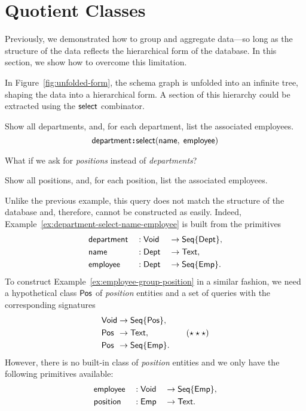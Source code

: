 
\section{Quotient Classes}
\label{sec:quotients}

Previously, we demonstrated how to group and aggregate data---so long as the
structure of the data reflects the hierarchical form of the database.  In this
section, we show how to overcome this limitation.

In Figure~\ref{fig:unfolded-form}, the schema graph is unfolded into an
infinite tree, shaping the data into a hierarchical form.  A section of this
hierarchy could be extracted using the $\mathsf{select}$ combinator.

\begin{demo}
    \label{ex:department-select-name-employee}
    Show all departments, and, for each department, list the associated
    employees.
    \begin{equation*}
        \mathsf{department}\!\boldsymbol{:}\!\mathsf{select}(\mathsf{name},\; \mathsf{employee})
    \end{equation*}
\end{demo}

What if we ask for \emph{positions} instead of \emph{departments}?

\begin{demo}
    \label{ex:employee-group-position}
    Show all positions, and, for each position, list the associated employees.
\end{demo}

Unlike the previous example, this query does not match the structure of the
database and, therefore, cannot be constructed as easily.  Indeed,
Example~\ref{ex:department-select-name-employee} is built from the primitives
\begin{alignat*}{3}
    & \mathsf{department} && : \mathsf{Void} && \to \mathsf{Seq}{\left\{\mathsf{Dept}\right\}}, \\
    & \mathsf{name} && : \mathsf{Dept} && \to \mathsf{Text}, \\
    & \mathsf{employee} && : \mathsf{Dept} && \to \mathsf{Seq}{\left\{\mathsf{Emp}\right\}}.
\end{alignat*}
To construct Example~\ref{ex:employee-group-position} in a similar fashion, we
need a hypothetical class $\mathsf{Pos}$ of \emph{position} entities and a set of
queries with the corresponding signatures
\begin{equation}
    \label{eq:group-components}
    \begin{alignedat}{2}
        & \mathsf{Void} && \to \mathsf{Seq}{\left\{\mathsf{Pos}\right\}}, \\
        & \mathsf{Pos} && \to \mathsf{Text}, \\
        & \mathsf{Pos} && \to \mathsf{Seq}{\left\{\mathsf{Emp}\right\}}.
    \end{alignedat} \tag{$\star\star\star$}
\end{equation}
However, there is no built-in class of \emph{position} entities and we only
have the following primitives available:
\begin{alignat*}{3}
    & \mathsf{employee} && : \mathsf{Void} && \to \mathsf{Seq}{\left\{\mathsf{Emp}\right\}}, \\
    & \mathsf{position} && : \mathsf{Emp} && \to \mathsf{Text}.
\end{alignat*}

